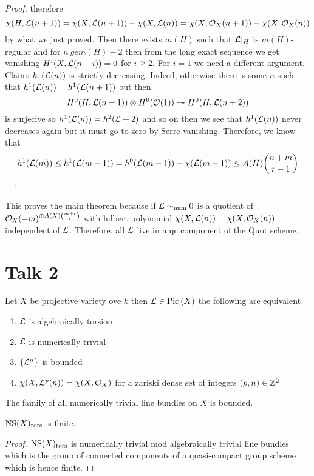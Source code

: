 \documentclass[12pt]{article}
\begin{document}
\begin{proof}
therefore
\[ \chi(H, \mathcal{L}(n+1)) = \chi(X, \mathcal{L}(n+1)) - \chi(X, \mathcal{L}(n)) = \chi(X, \mathcal{O}_{X}(n+1)) - \chi(X, \mathcal{O}_{X}(n)) \]
by what we just proved. Then there exists $m(H)$ such that $\mathcal{L}|_H$ is $m(H)$-regular and for $n \ ge m(H) - 2$ then from the long exact sequence we get vanishing $H^i(X, \mathcal{L}(n-i)) = 0$ for $i \ge 2$. For $i = 1$ we need a different argument. Claim: $h^1(\mathcal{L}(n))$ is strictly decreasing. Indeed, otherwise there is some $n$ such that $h^1(\mathcal{L}(n)) = h^1(\mathcal{L}(n+1))$ but then 
\[ H^0(H, \mathcal{L}(n+1)) \otimes H^0(\mathcal{O}_{}(1)) \twoheadrightarrow H^0(H, \mathcal{L}(n+2)) \]
is surjecive so $h^1(\mathcal{L}(n)) = h^2(\mathcal{L}+2)$ and so on then we see that $h^1(\mathcal{L}(n))$ never decreases again but it must go to zero by Serre vanishing. Therefore, we know that
\[ h^1(\mathcal{L}(m)) \le h^1(\mathcal{L}(m-1)) = h^0(\mathcal{L}(m-1)) - \chi(\mathcal{L}(m-1)) \le A(H) { n + m \choose r - 1 } \]
\end{proof}

This proves the main theorem because if $\mathcal{L} \sim_{\text{num}} 0$ is a quotient of $\mathcal{O}_{X}(-m)^{\oplus A(X) {m + r \choose r}}$ with hilbert polynomial $\chi(X, \mathcal{L}(n)) = \chi(X, \mathcal{O}_{X}(n))$ independent of $\mathcal{L}$. Therefore, all $\mathcal{L}$ live in a qc component of the Quot scheme.


\section{Talk 2}

\begin{theorem}
Let $X$ be projective variety ove $k$ then $\mathcal{L} \in \mathrm{Pic}^{} \left( X \right)$ the following are equivalent
\begin{enumerate}
\item $\mathcal{L}$ is algebraically torsion
\item $\mathcal{L}$ is numerically trivial
\item $\{ \mathcal{L}^n \}$ is bounded
\item $\chi(X, \mathcal{L}^p(n)) = \chi(X, \mathcal{O}_{X})$ for a zariski dense set of integers $(p,n) \in \mathbb{Z}^2$
\end{enumerate}
\end{theorem}

\begin{theorem}
The family of all numerically trivial line bundles on $X$ is bounded.
\end{theorem}

\begin{cor}
$\mathrm{NS}(X)_{\mathrm{tors}}$ is finite.
\end{cor}

\begin{proof}
$\mathrm{NS}(X)_{\mathrm{tors}}$ is numerically trivial mod algebraically trivial line bundles which is the group of connected components of a quasi-compact group scheme which is hence finite. 
\end{proof}
\end{document}

